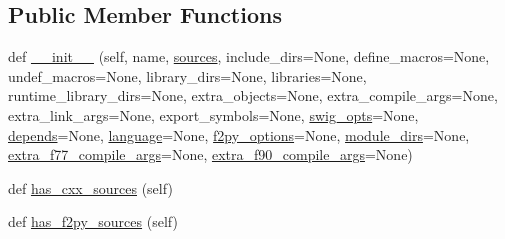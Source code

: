 \subsection*{Public Member Functions}
\begin{DoxyCompactItemize}
\item 
def \hyperlink{classnumpy_1_1distutils_1_1extension_1_1Extension_af89b084c55694febda8caf7bf2e8f551}{\+\_\+\+\_\+init\+\_\+\+\_\+} (self, name, \hyperlink{classnumpy_1_1distutils_1_1extension_1_1Extension_a5c763dbd644ad01edebefd5b5bdbf63a}{sources}, include\+\_\+dirs=None, define\+\_\+macros=None, undef\+\_\+macros=None, library\+\_\+dirs=None, libraries=None, runtime\+\_\+library\+\_\+dirs=None, extra\+\_\+objects=None, extra\+\_\+compile\+\_\+args=None, extra\+\_\+link\+\_\+args=None, export\+\_\+symbols=None, \hyperlink{classnumpy_1_1distutils_1_1extension_1_1Extension_aaf94c3c45f5acdbe821e3b0f6ee87136}{swig\+\_\+opts}=None, \hyperlink{classnumpy_1_1distutils_1_1extension_1_1Extension_a7e1ad17d1819aaf93b3ae4056d9b0a24}{depends}=None, \hyperlink{classnumpy_1_1distutils_1_1extension_1_1Extension_af7c51af2bbc2d8ed2a6ed8244aa6ea8d}{language}=None, \hyperlink{classnumpy_1_1distutils_1_1extension_1_1Extension_af8332487960ce13f8f1ab2d96ff4e4e9}{f2py\+\_\+options}=None, \hyperlink{classnumpy_1_1distutils_1_1extension_1_1Extension_a6fa1250ef3ef1abfe4f0afd52e7ba8ee}{module\+\_\+dirs}=None, \hyperlink{classnumpy_1_1distutils_1_1extension_1_1Extension_a67d939e16e48b3365d5ef90b87449444}{extra\+\_\+f77\+\_\+compile\+\_\+args}=None, \hyperlink{classnumpy_1_1distutils_1_1extension_1_1Extension_a8b37eb5cdffa8234063f92181d7b948a}{extra\+\_\+f90\+\_\+compile\+\_\+args}=None)
\item 
def \hyperlink{classnumpy_1_1distutils_1_1extension_1_1Extension_a1dbf98fe50e3e9b1c0d09086e8dcbecb}{has\+\_\+cxx\+\_\+sources} (self)
\item 
def \hyperlink{classnumpy_1_1distutils_1_1extension_1_1Extension_a34b1c5ff07ddbd3d585bb0e6e285de1d}{has\+\_\+f2py\+\_\+sources} (self)
\end{DoxyCompactItemize}
